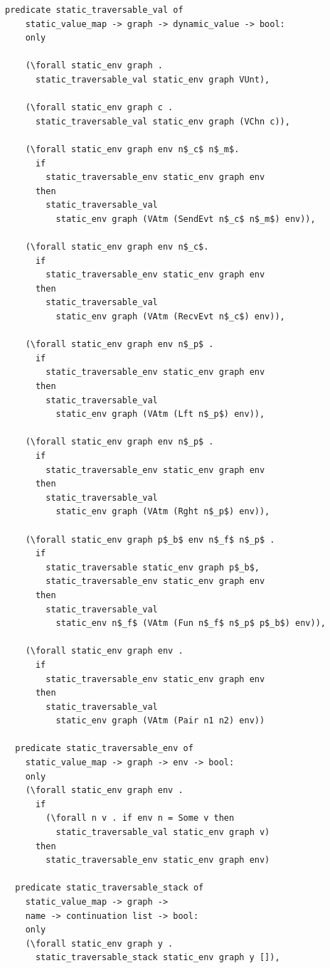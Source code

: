 \documentclass[10pt]{article}
\begin{document}
\begin{lstlisting}[language=logic, mathescape]
  predicate static_traversable_val of
    static_value_map -> graph -> dynamic_value -> bool:
    only

    (\forall static_env graph .
      static_traversable_val static_env graph VUnt), 

    (\forall static_env graph c .
      static_traversable_val static_env graph (VChn c)),

    (\forall static_env graph env n$_c$ n$_m$.
      if
        static_traversable_env static_env graph env 
      then 
        static_traversable_val
          static_env graph (VAtm (SendEvt n$_c$ n$_m$) env)),

    (\forall static_env graph env n$_c$.
      if
        static_traversable_env static_env graph env 
      then
        static_traversable_val
          static_env graph (VAtm (RecvEvt n$_c$) env)),

    (\forall static_env graph env n$_p$ .
      if
        static_traversable_env static_env graph env 
      then
        static_traversable_val
          static_env graph (VAtm (Lft n$_p$) env)),

    (\forall static_env graph env n$_p$ .
      if
        static_traversable_env static_env graph env
      then
        static_traversable_val
          static_env graph (VAtm (Rght n$_p$) env)),

    (\forall static_env graph p$_b$ env n$_f$ n$_p$ .
      if
        static_traversable static_env graph p$_b$, 
        static_traversable_env static_env graph env
      then
        static_traversable_val
          static_env n$_f$ (VAtm (Fun n$_f$ n$_p$ p$_b$) env)),

    (\forall static_env graph env . 
      if
        static_traversable_env static_env graph env
      then
        static_traversable_val
          static_env graph (VAtm (Pair n1 n2) env))

  predicate static_traversable_env of
    static_value_map -> graph -> env -> bool: 
    only 
    (\forall static_env graph env .
      if
        (\forall n v . if env n = Some v then
          static_traversable_val static_env graph v)
      then
        static_traversable_env static_env graph env) 

  predicate static_traversable_stack of
    static_value_map -> graph ->
    name -> continuation list -> bool:
    only
    (\forall static_env graph y .
      static_traversable_stack static_env graph y []),


\end{lstlisting}
\end{document}

